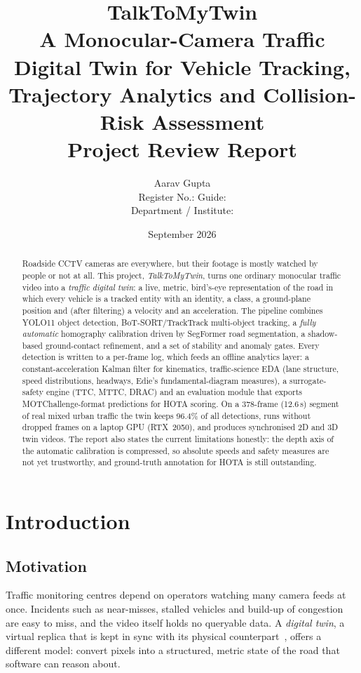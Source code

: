 \documentclass[11pt,a4paper]{article}
\title{\textbf{TalkToMyTwin}\\[4pt]
\large A Monocular-Camera Traffic Digital Twin for Vehicle Tracking,\\
Trajectory Analytics and Collision-Risk Assessment\\[10pt]
\normalsize Project Review Report}
\author{Aarav Gupta\\
\small Register No.: \underline{\hspace{3cm}} \quad Guide: \underline{\hspace{4cm}}\\
\small Department / Institute: \underline{\hspace{7cm}}}
\date{September 2026}
\begin{document}
\maketitle

\begin{abstract}
\noindent
Roadside CCTV cameras are everywhere, but their footage is mostly watched by people or not at all. This project,
\emph{TalkToMyTwin}, turns one ordinary monocular traffic video into a \emph{traffic digital twin}: a live,
metric, bird's-eye representation of the road in which every vehicle is a tracked entity with an identity,
a class, a ground-plane position and (after filtering) a velocity and an acceleration. The pipeline combines
YOLO11 object detection, BoT-SORT/TrackTrack multi-object tracking, a \emph{fully automatic} homography
calibration driven by SegFormer road segmentation, a shadow-based ground-contact refinement, and a set of
stability and anomaly gates. Every detection is written to a per-frame log, which feeds an offline analytics
layer: a constant-acceleration Kalman filter for kinematics, traffic-science EDA (lane structure, speed
distributions, headways, Edie's fundamental-diagram measures), a surrogate-safety engine (TTC, MTTC, DRAC) and
an evaluation module that exports MOTChallenge-format predictions for HOTA scoring. On a 378-frame (12.6\,s)
segment of real mixed urban traffic the twin keeps 96.4\% of all detections, runs without dropped frames on a
laptop GPU (RTX~2050), and produces synchronised 2D and 3D twin videos. The report also states the current
limitations honestly: the depth axis of the automatic calibration is compressed, so absolute speeds and
safety measures are not yet trustworthy, and ground-truth annotation for HOTA is still outstanding.
\end{abstract}

\tableofcontents
\newpage

\section{Introduction}
\subsection{Motivation}
Traffic monitoring centres depend on operators watching many camera feeds at once. Incidents such as near-misses,
stalled vehicles and build-up of congestion are easy to miss, and the video itself holds no queryable data.
A \emph{digital twin}, a virtual replica that is kept in sync with its physical counterpart~\cite{grieves2017,tao2019},
offers a different model: convert pixels into a structured, metric state of the road that software can reason about.
\end{document}
